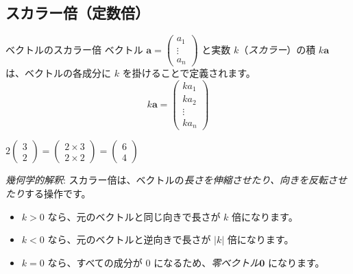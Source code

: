 \subsection{スカラー倍（定数倍）}
\begin{dfn}{ベクトルのスカラー倍}
ベクトル $\bm{a} = \begin{pmatrix} a_1 \\ \vdots \\ a_n \end{pmatrix}$ と実数 $k$（\emph{スカラー}）の積 $k\bm{a}$ は、ベクトルの各成分に $k$ を掛けることで定義されます。
\[k\bm{a} = \begin{pmatrix} k a_1 \\ k a_2 \\ \vdots \\ k a_n \end{pmatrix}\]
\end{dfn}
\begin{ex}
$2 \begin{pmatrix} 3 \\ 2 \end{pmatrix} = \begin{pmatrix} 2 \times 3 \\ 2 \times 2 \end{pmatrix} = \begin{pmatrix} 6 \\ 4 \end{pmatrix}$
\end{ex}

\emph{幾何学的解釈}: スカラー倍は、ベクトルの\emph{長さを伸縮させたり、向きを反転させたり}する操作です。
\begin{itemize}
\item $k > 0$ なら、元のベクトルと同じ向きで長さが $k$ 倍になります。
\item $k < 0$ なら、元のベクトルと逆向きで長さが $|k|$ 倍になります。
\item $k = 0$ なら、すべての成分が $0$ になるため、\emph{零ベクトル}$\bm{0}$ になります。
\end{itemize}

